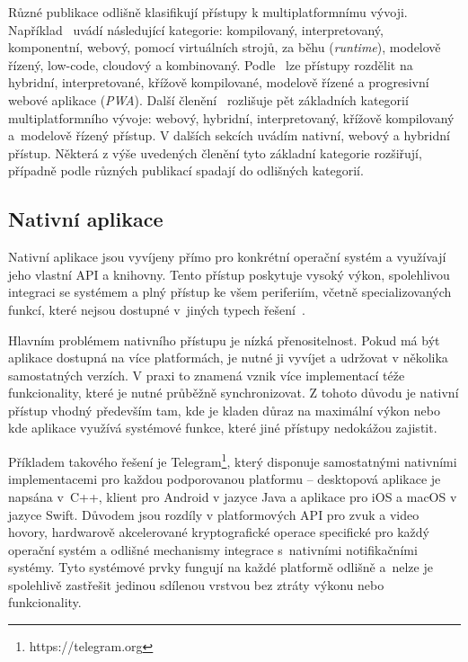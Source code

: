Různé publikace odlišně klasifikují přístupy k multiplatformnímu vývoji. Například~\cite{CrossPlatform} uvádí následující kategorie: kompilovaný, interpretovaný, komponentní, webový, pomocí virtuálních strojů, za běhu (\textit{runtime}), modelově řízený, low-code, cloudový a kombinovaný. Podle~\cite{CrossPlatformSurvey} lze přístupy rozdělit na hybridní, interpretované, křížově kompilované, modelově řízené a progresivní webové aplikace (\textit{PWA}). Další členění~\cite{Taxonomy} rozlišuje pět základních kategorií multiplatformního vývoje: webový, hybridní, interpretovaný, křížově kompilovaný a~modelově řízený přístup. V dalších sekcích uvádím nativní, webový a hybridní přístup. Některá z výše uvedených členění tyto základní kategorie rozšiřují, případně podle různých publikací spadají do odlišných kategorií.

\subsection{Nativní aplikace}
Nativní aplikace jsou vyvíjeny přímo pro konkrétní operační systém a využívají jeho vlastní API a knihovny. Tento přístup poskytuje vysoký výkon, spolehlivou integraci se systémem a plný přístup ke všem periferiím, včetně specializovaných funkcí, které nejsou dostupné v~jiných typech řešení~\cite{CrossPlatformSurvey}.

Hlavním problémem nativního přístupu je nízká přenositelnost. Pokud má být aplikace dostupná na více platformách, je nutné ji vyvíjet a udržovat v několika samostatných verzích. V praxi to znamená vznik více implementací téže funkcionality, které je nutné průběžně synchronizovat. Z tohoto důvodu je nativní přístup vhodný především tam, kde je kladen důraz na maximální výkon nebo kde aplikace využívá systémové funkce, které jiné přístupy nedokážou zajistit.

Příkladem takového řešení je Telegram\footnote{https://telegram.org}, 
který disponuje samostatnými nativními implementacemi pro každou podporovanou platformu -- desktopová aplikace je napsána v~C++, klient pro Android v jazyce Java a aplikace pro iOS a macOS v jazyce Swift. Důvodem jsou rozdíly v platformových API pro zvuk a video hovory, hardwarově akcelerované kryptografické operace specifické pro každý operační systém a odlišné mechanismy 
integrace s~nativními notifikačními systémy. Tyto systémové prvky fungují na každé platformě odlišně a~nelze je spolehlivě zastřešit jedinou sdílenou vrstvou bez ztráty výkonu nebo funkcionality.

